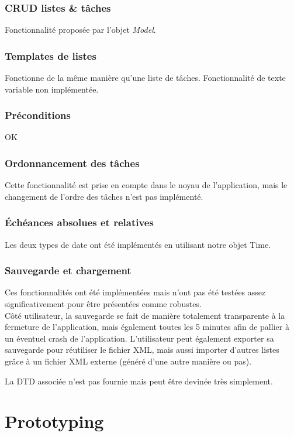 		\subsection{CRUD listes \& tâches}
			Fonctionnalité proposée par l'objet \emph{Model}.
			
		\subsection{Templates de listes}
			Fonctionne de la même manière qu'une liste de tâches. Fonctionnalité de texte variable non implémentée.
		
		\subsection{Préconditions}
			OK
			
		\subsection{Ordonnancement des tâches}
			Cette fonctionnalité est prise en compte dans le noyau de l'application, mais le changement de l'ordre des tâches n'est pas implémenté.
			
		\subsection{Échéances absolues et relatives}
			Les deux types de date ont été implémentés en utilisant notre objet Time.
		
		\subsection{Sauvegarde et chargement}
			Ces fonctionnalités ont été implémentées mais n'ont pas été testées assez significativement pour être présentées comme robustes.\\
			
			Côté utilisateur, la sauvegarde se fait de manière totalement transparente à la fermeture de l'application, mais également toutes les 5 minutes afin de pallier à un éventuel crash de l'application. L'utilisateur peut également exporter sa sauvegarde pour réutiliser le fichier XML, mais aussi importer d'autres listes grâce à un fichier XML externe (généré d'une autre manière ou pas).
			
			La DTD associée n'est pas fournie mais peut être devinée très simplement.


\chapter{Prototyping}

